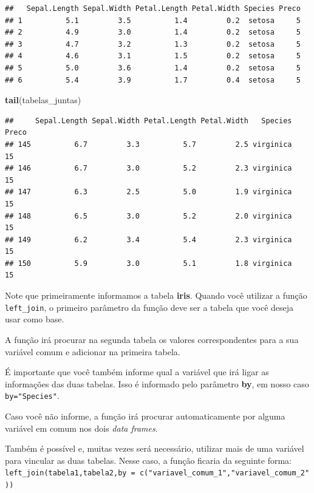 \documentclass[
]{book}
\newenvironment{Shaded}{\begin{snugshade}}{\end{snugshade}}
\newcommand{\KeywordTok}[1]{\textcolor[rgb]{0.13,0.29,0.53}{\textbf{#1}}}
\newcommand{\NormalTok}[1]{#1}
\begin{document}
\begin{verbatim}
##   Sepal.Length Sepal.Width Petal.Length Petal.Width Species Preco
## 1          5.1         3.5          1.4         0.2  setosa     5
## 2          4.9         3.0          1.4         0.2  setosa     5
## 3          4.7         3.2          1.3         0.2  setosa     5
## 4          4.6         3.1          1.5         0.2  setosa     5
## 5          5.0         3.6          1.4         0.2  setosa     5
## 6          5.4         3.9          1.7         0.4  setosa     5
\end{verbatim}

\begin{Shaded}
\begin{Highlighting}[]
\KeywordTok{tail}\NormalTok{(tabelas_juntas)}
\end{Highlighting}
\end{Shaded}

\begin{verbatim}
##     Sepal.Length Sepal.Width Petal.Length Petal.Width   Species Preco
## 145          6.7         3.3          5.7         2.5 virginica    15
## 146          6.7         3.0          5.2         2.3 virginica    15
## 147          6.3         2.5          5.0         1.9 virginica    15
## 148          6.5         3.0          5.2         2.0 virginica    15
## 149          6.2         3.4          5.4         2.3 virginica    15
## 150          5.9         3.0          5.1         1.8 virginica    15
\end{verbatim}

Note que primeiramente informamos a tabela \textbf{iris}. Quando você
utilizar a função \texttt{left\_join}, o primeiro parâmetro da função
deve ser a tabela que você deseja usar como base.

A função irá procurar na segunda tabela os valores correspondentes para
a sua variável comum e adicionar na primeira tabela.

É importante que você também informe qual a variável que irá ligar as
informações das duas tabelas. Isso é informado pelo parâmetro
\textbf{by}, em nosso caso \texttt{by="Species"}.

Caso você não informe, a função irá procurar automaticamente por alguma
variável em comum nos dois \emph{data frames}.

Também é possível e, muitas vezes será necessário, utilizar mais de uma
variável para vincular as duas tabelas. Nesse caso, a função ficaria da
seguinte forma:
\texttt{left\_join(tabela1,tabela2,by\ =\ c("variavel\_comum\_1","variavel\_comum\_2"))}
\end{document}
